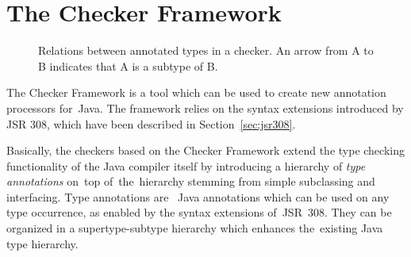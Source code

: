 \documentclass{pracamgr}
\theoremstyle{break}
\theoremstyle{break}
\theoremstyle{break}
\begin{document}
\section{The Checker Framework}
\label{sec:framework}

\begin{figure}
  \centering
  
  \caption{Relations between annotated types in a checker. An arrow from
    A to B indicates that A is a subtype of B.}
  \label{fig:example-checker-hierarchy}
\end{figure}

The Checker Framework is a tool which can be used to create new
annotation processors for~Java. The framework relies on the syntax
extensions introduced by JSR 308, which have been described in
Section~\ref{sec:jsr308}. 

Basically, the checkers based on the Checker Framework extend the
type checking functionality of the Java compiler itself by introducing
a hierarchy of \emph{type annotations} on~top of~the~hierarchy
stemming from simple subclassing and interfacing. Type annotations
are~ Java annotations which can be used on any type occurrence, as
enabled by the syntax extensions of~JSR~308. They can be organized in
a supertype-subtype hierarchy which enhances the~existing Java type
hierarchy.
\end{document}
